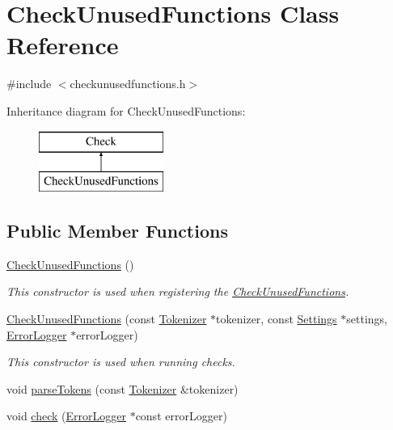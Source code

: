 \hypertarget{class_check_unused_functions}{\section{Check\-Unused\-Functions Class Reference}
\label{class_check_unused_functions}
}


{\ttfamily \#include $<$checkunusedfunctions.\-h$>$}

Inheritance diagram for Check\-Unused\-Functions\-:\begin{figure}[H]
\begin{center}
\leavevmode
\includegraphics[height=2.000000cm]{class_check_unused_functions}
\end{center}
\end{figure}
\subsection*{Public Member Functions}
\begin{DoxyCompactItemize}
\item 
\hyperlink{class_check_unused_functions_aef00707d019317d7b610d1df3f05e81e}{Check\-Unused\-Functions} ()
\begin{DoxyCompactList}\small\item\em This constructor is used when registering the \hyperlink{class_check_unused_functions}{Check\-Unused\-Functions}. \end{DoxyCompactList}\item 
\hyperlink{class_check_unused_functions_abcb6e665e0fb23d7908af805cadac775}{Check\-Unused\-Functions} (const \hyperlink{class_tokenizer}{Tokenizer} $\ast$tokenizer, const \hyperlink{class_settings}{Settings} $\ast$settings, \hyperlink{class_error_logger}{Error\-Logger} $\ast$error\-Logger)
\begin{DoxyCompactList}\small\item\em This constructor is used when running checks. \end{DoxyCompactList}\item 
void \hyperlink{class_check_unused_functions_a99929a71cc0c3a69e90c160a08178fa4}{parse\-Tokens} (const \hyperlink{class_tokenizer}{Tokenizer} \&tokenizer)
\item 
void \hyperlink{class_check_unused_functions_ad89f0ddf22cb4eaf861089cd790a1e95}{check} (\hyperlink{class_error_logger}{Error\-Logger} $\ast$const error\-Logger)
\end{DoxyCompactItemize}
